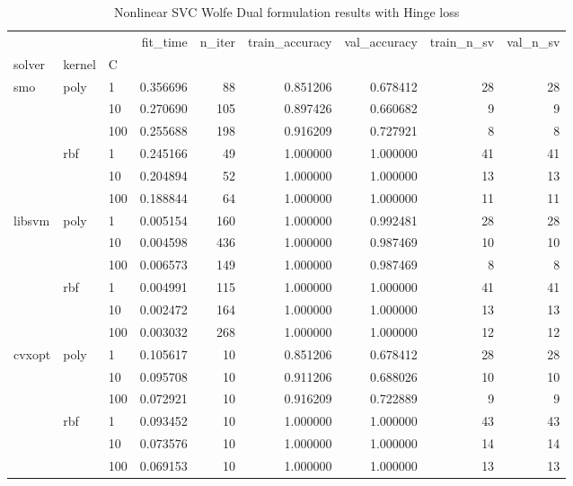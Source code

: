 \begin{table}[H]
\centering
\caption{Nonlinear SVC Wolfe Dual formulation results with Hinge loss}
\label{nonlinear_dual_svc_cv_results}
\begin{tabular}{lllrrrrrr}
\toprule
       &     &     &  fit\_time &  n\_iter &  train\_accuracy &  val\_accuracy &  train\_n\_sv &  val\_n\_sv \\
solver & kernel & C &           &         &                 &               &             &           \\
\midrule
smo & poly & 1   &  0.356696 &      88 &        0.851206 &      0.678412 &          28 &        28 \\
       &     & 10  &  0.270690 &     105 &        0.897426 &      0.660682 &           9 &         9 \\
       &     & 100 &  0.255688 &     198 &        0.916209 &      0.727921 &           8 &         8 \\
       & rbf & 1   &  0.245166 &      49 &        1.000000 &      1.000000 &          41 &        41 \\
       &     & 10  &  0.204894 &      52 &        1.000000 &      1.000000 &          13 &        13 \\
       &     & 100 &  0.188844 &      64 &        1.000000 &      1.000000 &          11 &        11 \\
libsvm & poly & 1   &  0.005154 &     160 &        1.000000 &      0.992481 &          28 &        28 \\
       &     & 10  &  0.004598 &     436 &        1.000000 &      0.987469 &          10 &        10 \\
       &     & 100 &  0.006573 &     149 &        1.000000 &      0.987469 &           8 &         8 \\
       & rbf & 1   &  0.004991 &     115 &        1.000000 &      1.000000 &          41 &        41 \\
       &     & 10  &  0.002472 &     164 &        1.000000 &      1.000000 &          13 &        13 \\
       &     & 100 &  0.003032 &     268 &        1.000000 &      1.000000 &          12 &        12 \\
cvxopt & poly & 1   &  0.105617 &      10 &        0.851206 &      0.678412 &          28 &        28 \\
       &     & 10  &  0.095708 &      10 &        0.911206 &      0.688026 &          10 &        10 \\
       &     & 100 &  0.072921 &      10 &        0.916209 &      0.722889 &           9 &         9 \\
       & rbf & 1   &  0.093452 &      10 &        1.000000 &      1.000000 &          43 &        43 \\
       &     & 10  &  0.073576 &      10 &        1.000000 &      1.000000 &          14 &        14 \\
       &     & 100 &  0.069153 &      10 &        1.000000 &      1.000000 &          13 &        13 \\
\bottomrule
\end{tabular}
\end{table}
